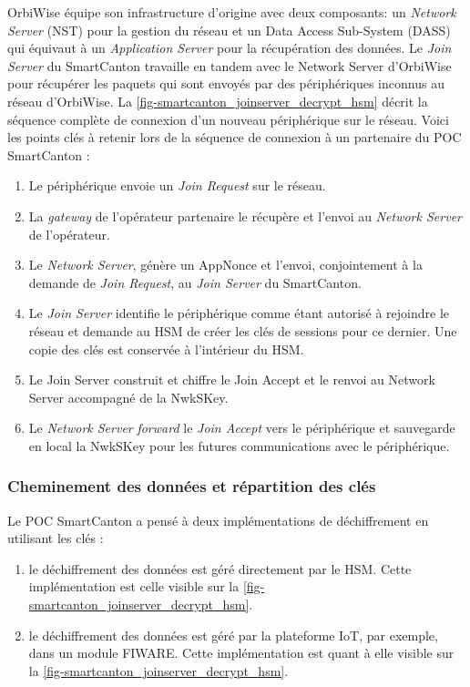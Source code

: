 OrbiWise équipe son infrastructure d'origine avec deux composants: un \textit{Network Server} (NST) pour la gestion du réseau et un Data Access Sub-System (DASS) qui équivaut à un \textit{Application Server} pour la récupération des données. Le \textit{Join Server} du SmartCanton travaille en tandem avec le Network Server d'OrbiWise pour récupérer les paquets qui sont envoyés par des périphériques inconnus au réseau d'OrbiWise. La \cref{fig-smartcanton_joinserver_decrypt_hsm} décrit la séquence complète de connexion d'un nouveau périphérique sur le réseau. Voici les points clés à retenir lors de la séquence de connexion à un partenaire du POC SmartCanton : 
\begin{enumerate}
    \item Le périphérique envoie un \textit{Join Request} sur le réseau.
    \item La \textit{gateway} de l'opérateur partenaire le récupère et l'envoi au \textit{Network Server} de l'opérateur.
    \item Le \textit{Network Server}, génère un AppNonce et l'envoi, conjointement à la demande de \textit{Join Request}, au \textit{Join Server} du SmartCanton.
    \item Le \textit{Join Server} identifie le périphérique comme étant autorisé à rejoindre le réseau et demande au HSM de créer les clés de sessions pour ce dernier. Une copie des clés est conservée à l'intérieur du HSM.
    \item Le Join Server construit et chiffre le Join Accept et le renvoi au Network Server accompagné de la NwkSKey.
    \item Le \textit{Network Server} \textit{forward} le \textit{Join Accept} vers le périphérique et sauvegarde en local la NwkSKey pour les futures communications avec le périphérique.
\end{enumerate}


\subsubsection{Cheminement des données et répartition des clés}

Le POC SmartCanton a pensé à deux implémentations de déchiffrement en utilisant les clés : 
\begin{enumerate}
    \item le déchiffrement des données est géré directement par le HSM. Cette implémentation est celle visible sur la \cref{fig-smartcanton_joinserver_decrypt_hsm}.
    \item le déchiffrement des données est géré par la plateforme IoT, par exemple, dans un module FIWARE. Cette implémentation est quant à elle visible sur la \cref{fig-smartcanton_joinserver_decrypt_hsm}.
\end{enumerate}

